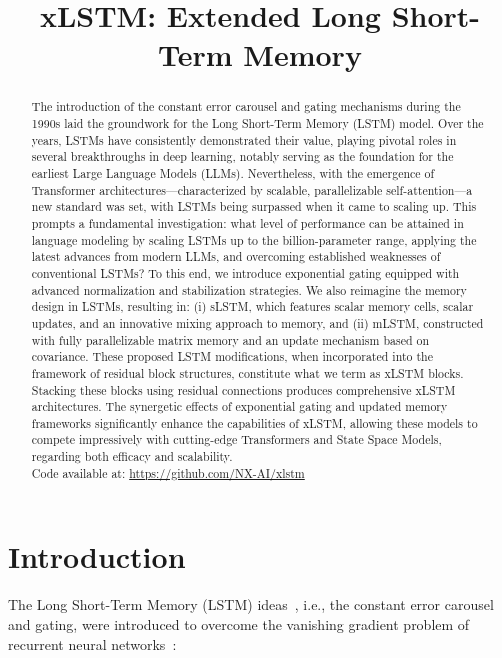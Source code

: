 \title{xLSTM: Extended Long Short-Term Memory}

\begin{abstract}
The introduction of the constant error carousel and gating mechanisms during the 1990s laid the groundwork for the Long Short-Term Memory (LSTM) model. Over the years, LSTMs have consistently demonstrated their value, playing pivotal roles in several breakthroughs in deep learning, notably serving as the foundation for the earliest Large Language Models (LLMs). Nevertheless, with the emergence of Transformer architectures—characterized by scalable, parallelizable self-attention—a new standard was set, with LSTMs being surpassed when it came to scaling up. This prompts a fundamental investigation: what level of performance can be attained in language modeling by scaling LSTMs up to the billion-parameter range, applying the latest advances from modern LLMs, and overcoming established weaknesses of conventional LSTMs? To this end, we introduce exponential gating equipped with advanced normalization and stabilization strategies. We also reimagine the memory design in LSTMs, resulting in: (i) sLSTM, which features scalar memory cells, scalar updates, and an innovative mixing approach to memory, and (ii) mLSTM, constructed with fully parallelizable matrix memory and an update mechanism based on covariance. These proposed LSTM modifications, when incorporated into the framework of residual block structures, constitute what we term as xLSTM blocks. Stacking these blocks using residual connections produces comprehensive xLSTM architectures. The synergetic effects of exponential gating and updated memory frameworks significantly enhance the capabilities of xLSTM, allowing these models to compete impressively with cutting-edge Transformers and State Space Models, regarding both efficacy and scalability.\\
Code available at: \url{https://github.com/NX-AI/xlstm}
\end{abstract}

\section{Introduction}
\label{sec:intro}

The Long Short-Term Memory (LSTM) ideas~\citep{Hochreiter:91,Hochreiter:97nips,Hochreiter:97}, i.e., the constant error carousel and gating, were introduced to overcome the vanishing gradient problem of recurrent neural networks~\citep{Hochreiter:91,Hochreiter:00book}:

